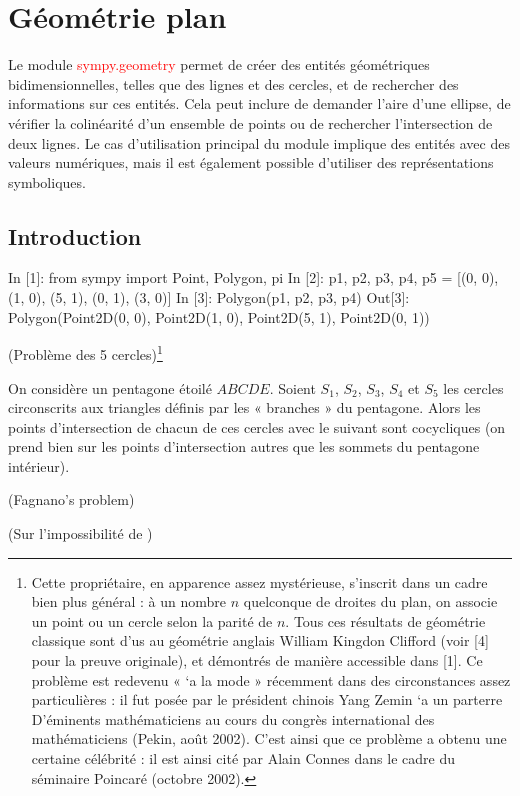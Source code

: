 \chapter{Géométrie plan}
Le module \textcolor{red}{sympy.geometry} permet de créer des entités géométriques bidimensionnelles, telles que des lignes et des cercles, et de rechercher des informations sur ces entités. Cela peut inclure de demander l’aire d’une ellipse, de vérifier la colinéarité d’un ensemble de points ou de rechercher l’intersection de deux lignes. Le cas d'utilisation principal du module implique des entités avec des valeurs numériques, mais il est également possible d'utiliser des représentations symboliques.

\section{Introduction}

\begin{python}
In [1]: from sympy import Point, Polygon, pi
In [2]: p1, p2, p3, p4, p5 = [(0, 0), (1, 0), (5, 1), (0, 1), (3, 0)]
In [3]: Polygon(p1, p2, p3, p4)
Out[3]: Polygon(Point2D(0, 0), Point2D(1, 0), Point2D(5, 1), Point2D(0, 1))
\end{python}

\begin{exercise}{(Problème des 5 cercles)\footnote{Cette propriétaire, en apparence assez mystérieuse, s’inscrit dans un cadre bien plus général : à un nombre $n$ quelconque de droites du plan, on associe un point
ou un cercle selon la parité de $n$. Tous ces résultats de géométrie classique sont d'us au géométrie anglais William Kingdon Clifford (voir [4] pour la preuve originale), et démontrés de manière accessible dans [1]. Ce problème est redevenu « `a la mode » récemment dans des circonstances assez particulières : il fut posée
par le président chinois Yang Zemin `a un parterre D’éminents mathématiciens au cours du congrès international des mathématiciens (Pekin, août 2002). C’est ainsi que ce problème a obtenu une certaine célébrité : il est ainsi cité par Alain Connes dans le cadre du séminaire Poincaré (octobre 2002).}}

On considère un pentagone étoilé $ABCDE$. Soient $S_{1}$, $S_{2}$, $S_{3}$, $S_{4}$ et $S_{5}$  les cercles circonscrits aux triangles définis par les « branches » du pentagone. Alors les points d’intersection
de chacun de ces cercles avec le suivant sont cocycliques (on prend bien sur les points d’intersection autres que les sommets du pentagone intérieur). 
\end{exercise}
\begin{exercise}{(Fagnano's problem)}
\end{exercise}
\begin{exercise}{(Sur l’impossibilité de )}
\end{exercise}

